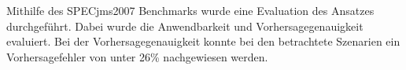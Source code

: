 Mithilfe des SPECjms2007 Benchmarks wurde eine Evaluation des Ansatzes durchgeführt. Dabei wurde die Anwendbarkeit und Vorhersagegenauigkeit evaluiert. Bei der Vorhersagegenauigkeit konnte bei den betrachtete Szenarien ein Vorhersagefehler von unter 26\% nachgewiesen werden.